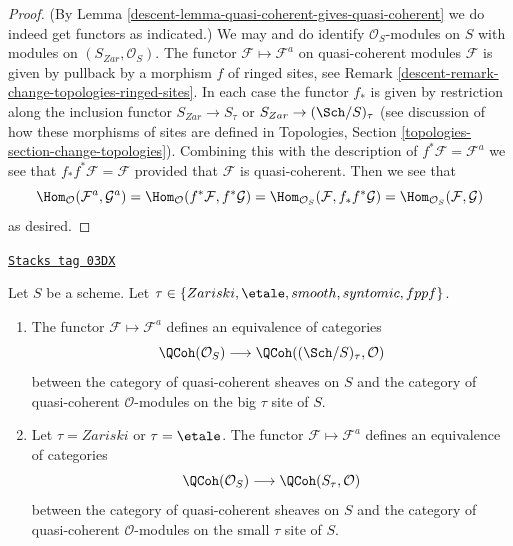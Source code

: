 \begin{proof}

(By Lemma \ref{descent-lemma-quasi-coherent-gives-quasi-coherent} we do
indeed get functors as indicated.)
We may and do identify $\mathcal{O}_S$-modules on $S$ with
modules on $(S_{Zar}, \mathcal{O}_S)$.
The functor $\mathcal{F} \mapsto \mathcal{F}^a$ on quasi-coherent modules
$\mathcal{F}$ is given by pullback by a morphism $f$
of ringed sites, see Remark \ref{descent-remark-change-topologies-ringed-sites}.
In each case the functor $f_*$ is given by restriction
along the inclusion functor $S_{Zar} \to S_\tau$ or
$S_{Zar} \to (\Sch/S)_\tau$ (see discussion of how
these morphisms of sites are defined in Topologies, Section
\ref{topologies-section-change-topologies}).
Combining this with the description of $f^*\mathcal{F} = \mathcal{F}^a$
we see that $f_*f^*\mathcal{F} = \mathcal{F}$ provided that
$\mathcal{F}$ is quasi-coherent. Then we see that
$$
\Hom_\mathcal{O}(\mathcal{F}^a, \mathcal{G}^a) =
\Hom_\mathcal{O}(f^*\mathcal{F}, f^*\mathcal{G}) =
\Hom_{\mathcal{O}_S}(\mathcal{F}, f_*f^*\mathcal{G}) =
\Hom_{\mathcal{O}_S}(\mathcal{F}, \mathcal{G})
$$
as desired.
\end{proof}

\begin{proposition}
\label{descent-proposition-equivalence-quasi-coherent}
\href{https://stacks.math.columbia.edu/tag/03DX}{\texttt{Stacks tag 03DX}}

Let $S$ be a scheme.
Let $\tau \in \{Zariski, \linebreak[0] \etale, \linebreak[0]
smooth, \linebreak[0] syntomic, \linebreak[0] fppf\}$.
\begin{enumerate}
\item The functor $\mathcal{F} \mapsto \mathcal{F}^a$
defines an equivalence of categories
$$
\QCoh(\mathcal{O}_S)
\longrightarrow
\QCoh((\Sch/S)_\tau, \mathcal{O})
$$
between the category of quasi-coherent sheaves on $S$ and the category
of quasi-coherent $\mathcal{O}$-modules on the big $\tau$ site of $S$.
\item Let $\tau = Zariski$ or $\tau = \etale$.
The functor $\mathcal{F} \mapsto \mathcal{F}^a$
defines an equivalence of categories
$$
\QCoh(\mathcal{O}_S)
\longrightarrow
\QCoh(S_\tau, \mathcal{O})
$$
between the category of quasi-coherent sheaves on $S$ and the category
of quasi-coherent $\mathcal{O}$-modules on the small $\tau$ site of $S$.
\end{enumerate}
\end{proposition}

